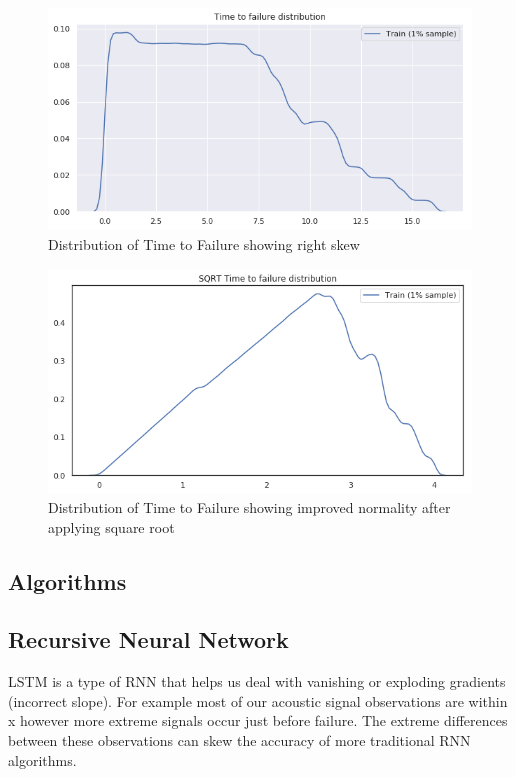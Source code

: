 \documentclass[]{llncs} %
\begin{document}
\begin{figure}
	\centering
	\includegraphics[width=1\linewidth]{../GPUProject/transform1}
	\caption{Distribution of Time to Failure showing right skew}
	\label{fig:morethan90percentb}
\end{figure}

\begin{figure}
	\centering
	\includegraphics[width=1\linewidth]{../GPUProject/transform2}
	\caption{Distribution of Time to Failure showing improved normality after applying square root}
	\label{fig:morethan90percentc}
\end{figure}





\subsection{Algorithms}
\subsection{Recursive Neural Network}
LSTM is a type of RNN that helps us deal with vanishing or exploding gradients (incorrect slope). For example most of our acoustic signal observations are within x however more extreme signals occur just before failure. The extreme differences between these observations can skew the accuracy of more traditional RNN algorithms.
\end{document}
